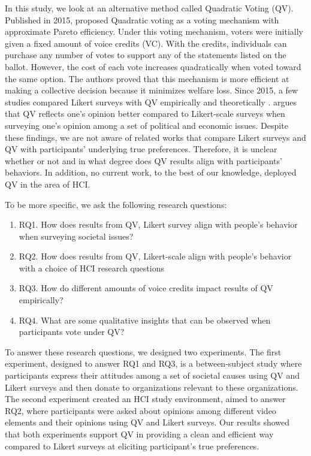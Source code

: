 In this study, 
we look at an alternative method
called Quadratic Voting (QV).
Published in 2015,
\textcite{posner2018radical}
proposed Quadratic voting
as a voting mechanism 
with approximate Pareto efficiency.
Under this voting mechanism,
voters were initially given 
a fixed amount of voice credits (VC).
With the credits, 
individuals can purchase 
any number of votes to support any of the statements
listed on the ballot.
However, the cost of each vote 
increases quadratically 
when voted toward the same option.
The authors proved that this 
mechanism is more efficient 
at making a collective decision 
because it minimizes welfare loss.
Since 2015, a few studies
compared Likert surveys with QV 
empirically and theoretically
\cite{quarfoot2017quadratic, naylor2017first}.
\textcite{cavaille2018towards} argues that 
QV reflects one's opinion better 
compared to Likert-scale surveys 
when surveying one's opinion
among a set of political and economic issues.
Despite these findings,
we are not aware of related works that
compare Likert surveys and QV
with participants' underlying true preferences.
Therefore, it is unclear whether or not
and in what degree
does QV results align with participants' behaviors.
In addition, 
no current work, to the best of our knowledge,
deployed QV in the area of HCI.

To be more specific, 
we ask the following research questions:
\begin{enumerate}[label={},leftmargin=\parindent]
    \item RQ1. How does results from 
               QV, Likert survey
               align with people's behavior 
               when surveying societal issues?
    \item RQ2. How does results from 
               QV, Likert-scale 
               align with people's behavior 
               with a choice of HCI research questions
    \item RQ3. How do different amounts of
               voice credits impact results of QV empirically?
    \item RQ4. What are some qualitative insights that can be observed when participants vote under QV?

\end{enumerate}
To answer these research questions,
we designed two experiments.
The first experiment,
designed to answer RQ1 and RQ3,
is a between-subject study
where participants express their attitudes
among a set of societal causes using 
QV and Likert surveys
and then donate
to organizations relevant to these organizations.
The second experiment 
created an HCI study environment,
aimed to answer RQ2,
where participants were asked about 
opinions among different video elements
and their opinions using QV and Likert surveys.
Our results showed that both experiments support
QV in providing a clean and efficient way
compared to Likert surveys
at eliciting participant's true preferences.

